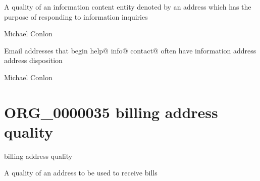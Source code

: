 \documentclass[letterpaper,10pt,english]{sphinxmanual}
\begin{document}
\begin{sphinxShadowBox}

\sphinxAtStartPar
A quality of an information content entity denoted by an address which has the purpose of responding to information inquiries
\end{sphinxShadowBox}

\begin{sphinxShadowBox}

\sphinxAtStartPar
Michael Conlon 
\end{sphinxShadowBox}

\begin{sphinxShadowBox}

\sphinxAtStartPar
Email addresses that begin help@ info@ contact@ often have information address address disposition
\end{sphinxShadowBox}

\begin{sphinxShadowBox}

\sphinxAtStartPar
Michael Conlon 
\end{sphinxShadowBox}
\begin{quote}
\label{\detokenize{doc-ORG_0000035:org-0000035}}\label{\detokenize{doc-ORG_0000035:billing-address-quality}}\label{\detokenize{doc-ORG_0000035:org-0000035}}
\ignorespaces \end{quote}


\section{ORG\_0000035 \sphinxhyphen{} billing address quality}
\label{\detokenize{doc-ORG_0000035:org-0000035-billing-address-quality}}\label{\detokenize{doc-ORG_0000035:index-0}}\label{\detokenize{doc-ORG_0000035::doc}}
\begin{sphinxShadowBox}

\sphinxAtStartPar
billing address quality
\end{sphinxShadowBox}

\begin{sphinxShadowBox}

\sphinxAtStartPar
A quality of an address to be used to receive bills
\end{sphinxShadowBox}
\end{document}
